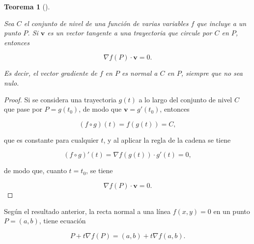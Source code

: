 \documentclass[
  a4paper,
]{scrreport}
\theoremstyle{plain}
\theoremstyle{plain}
\newtheorem{theorem}{Teorema}[chapter]
\theoremstyle{definition}
\theoremstyle{definition}
\theoremstyle{plain}
\theoremstyle{definition}
\theoremstyle{remark}
\begin{document}
\begin{theorem}[]\protect\hypertarget{thm-gradiente-normal-curvas-nivel}{}\label{thm-gradiente-normal-curvas-nivel}

Sea \(C\) el conjunto de nivel de una función de varias variables \(f\)
que incluye a un punto \(P\). Si \(\mathbf{v}\) es un vector tangente a
una trayectoria que circule por \(C\) en \(P\), entonces

\[
\nabla f(P) \cdot \mathbf{v} = 0.
\]

Es decir, el vector gradiente de \(f\) en \(P\) es normal a \(C\) en
\(P\), siempre que no sea nulo.

\end{theorem}

\begin{tcolorbox}[enhanced jigsaw, rightrule=.15mm, toptitle=1mm, colbacktitle=quarto-callout-note-color!10!white, bottomrule=.15mm, opacityback=0, arc=.35mm, breakable, toprule=.15mm, left=2mm, coltitle=black, colback=white, opacitybacktitle=0.6, titlerule=0mm, colframe=quarto-callout-note-color-frame, bottomtitle=1mm, title=\textcolor{quarto-callout-note-color}{\faInfo}\hspace{0.5em}{Demostración}, leftrule=.75mm]

\begin{proof}

Si se considera una trayectoria \(g(t)\) a lo largo del conjunto de
nivel \(C\) que pase por \(P=g(t_0)\), de modo que
\(\mathbf{v}=g'(t_0)\), entonces

\[
(f\circ g)(t) = f(g(t)) = C,
\]

que es constante para cualquier \(t\), y al aplicar la regla de la
cadena se tiene

\[
(f\circ g)'(t) = \nabla f(g(t))\cdot  g'(t) = 0,
\]

de modo que, cuanto \(t=t_0\), se tiene

\[
\nabla f(P)\cdot \mathbf{v} = 0.
\]

\end{proof}

\end{tcolorbox}

Según el resultado anterior, la recta normal a una línea \(f(x,y)=0\) en
un punto \(P=(a,b)\), tiene ecuación

\[
P+t\nabla f(P) = (a, b) + t \nabla f(a,b).
\]
\end{document}
